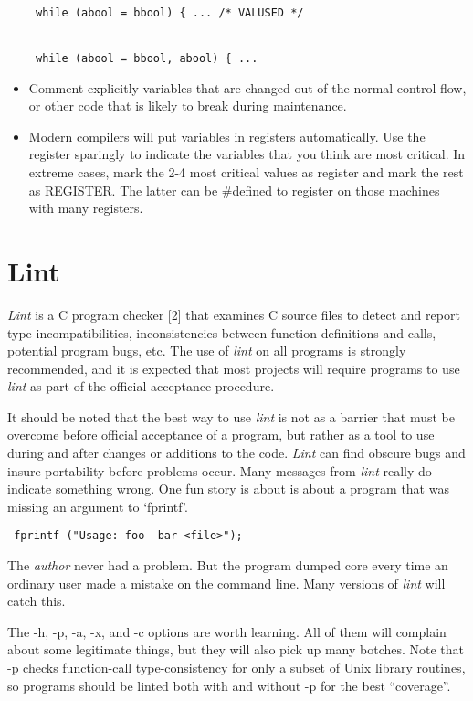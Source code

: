 \begin{itemize}
\begin{verbatim}
 while (abool = bbool) { ... /* VALUSED */ 


 while (abool = bbool, abool) { ... 
\end{verbatim}

\item Comment explicitly variables that are changed out of the normal control
flow, or other code that is likely to break during maintenance. 

\item Modern compilers will put variables in registers automatically. Use the
register sparingly to indicate the variables that you think are most critical.
In extreme cases, mark the 2-4 most critical values as register and mark the
rest as REGISTER. The latter can be \#defined to register on those machines
with many registers.
\end{itemize}

\section{Lint}

{\em Lint} is a C program checker [2] that examines C source files to detect and
report type incompatibilities, inconsistencies between function definitions and
calls, potential program bugs, etc. The use of {\em lint} on all programs is
strongly recommended, and it is expected that most projects will require
programs to use {\em lint} as part of the official acceptance procedure. 

It should be noted that the best way to use {\em lint} is not as a barrier that
must be overcome before official acceptance of a program, but rather as a tool
to use during and after changes or additions to the code. {\em Lint} can find
obscure bugs and insure portability before problems occur. Many messages from
{\em lint} really do indicate something wrong. One fun story is about is about
a program that was missing an argument to `fprintf'.
\begin{verbatim}
 fprintf ("Usage: foo -bar <file>"); 
\end{verbatim}
The {\em author} never had a problem. But the program dumped core every time an
ordinary user made a mistake on the command line. Many versions of {\em lint}
will catch this.

The -h, -p, -a, -x, and -c options are worth learning. All of them will
complain about some legitimate things, but they will also pick up many botches.
Note that -p checks function-call type-consistency for only a subset of Unix
library routines, so programs should be linted both with and without -p for the
best ``coverage''.

